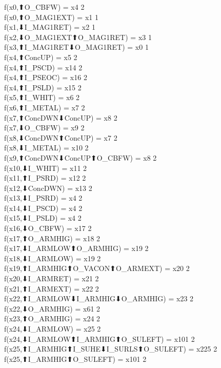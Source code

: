 f(x0,⬆O_CBFW) = x4 {2} \\
f(x0,⬆O_MAG1EXT) = x1 {1} \\
f(x1,⬇I_MAG1RET) = x2 {1} \\
f(x2,⬇O_MAG1EXT⬆O_MAG1RET) = x3 {1} \\
f(x3,⬆I_MAG1RET⬇O_MAG1RET) = x0 {1} \\
f(x4,⬆ConcUP) = x5 {2} \\
f(x4,⬆I_PSCD) = x14 {2} \\
f(x4,⬆I_PSEOC) = x16 {2} \\
f(x4,⬆I_PSLD) = x15 {2} \\
f(x5,⬆I_WHIT) = x6 {2} \\
f(x6,⬆I_METAL) = x7 {2} \\
f(x7,⬆ConcDWN⬇ConcUP) = x8 {2} \\
f(x7,⬇O_CBFW) = x9 {2} \\
f(x8,⬇ConcDWN⬆ConcUP) = x7 {2} \\
f(x8,⬇I_METAL) = x10 {2} \\
f(x9,⬆ConcDWN⬇ConcUP⬆O_CBFW) = x8 {2} \\
f(x10,⬇I_WHIT) = x11 {2} \\
f(x11,⬆I_PSRD) = x12 {2} \\
f(x12,⬇ConcDWN) = x13 {2} \\
f(x13,⬇I_PSRD) = x4 {2} \\
f(x14,⬇I_PSCD) = x4 {2} \\
f(x15,⬇I_PSLD) = x4 {2} \\
f(x16,⬇O_CBFW) = x17 {2} \\
f(x17,⬆O_ARMHIG) = x18 {2} \\
f(x17,⬇I_ARMLOW⬆O_ARMHIG) = x19 {2} \\
f(x18,⬇I_ARMLOW) = x19 {2} \\
f(x19,⬆I_ARMHIG⬆O_VACON⬆O_ARMEXT) = x20 {2} \\
f(x20,⬇I_ARMRET) = x21 {2} \\
f(x21,⬆I_ARMEXT) = x22 {2} \\
f(x22,⬆I_ARMLOW⬇I_ARMHIG⬇O_ARMHIG) = x23 {2} \\
f(x22,⬇O_ARMHIG) = x61 {2} \\
f(x23,⬆O_ARMHIG) = x24 {2} \\
f(x24,⬇I_ARMLOW) = x25 {2} \\
f(x24,⬇I_ARMLOW⬆I_ARMHIG⬆O_SULEFT) = x101 {2} \\
f(x25,⬆I_ARMHIG⬆I_SUHE⬇I_SURLS⬆O_SULEFT) = x225 {2} \\
f(x25,⬆I_ARMHIG⬆O_SULEFT) = x101 {2} \\

